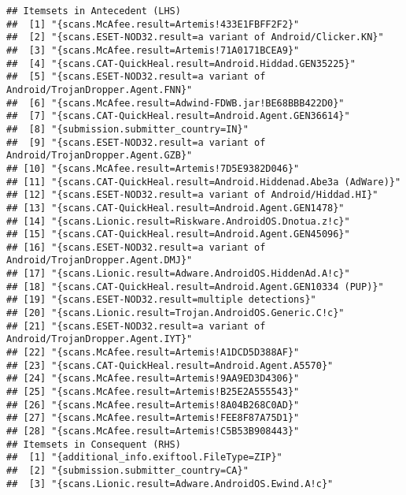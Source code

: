 \documentclass[
]{book}
\begin{document}
\begin{verbatim}
## Itemsets in Antecedent (LHS)
##  [1] "{scans.McAfee.result=Artemis!433E1FBFF2F2}"                            
##  [2] "{scans.ESET-NOD32.result=a variant of Android/Clicker.KN}"             
##  [3] "{scans.McAfee.result=Artemis!71A0171BCEA9}"                            
##  [4] "{scans.CAT-QuickHeal.result=Android.Hiddad.GEN35225}"                  
##  [5] "{scans.ESET-NOD32.result=a variant of Android/TrojanDropper.Agent.FNN}"
##  [6] "{scans.McAfee.result=Adwind-FDWB.jar!BE68BBB422D0}"                    
##  [7] "{scans.CAT-QuickHeal.result=Android.Agent.GEN36614}"                   
##  [8] "{submission.submitter_country=IN}"                                     
##  [9] "{scans.ESET-NOD32.result=a variant of Android/TrojanDropper.Agent.GZB}"
## [10] "{scans.McAfee.result=Artemis!7D5E9382D046}"                            
## [11] "{scans.CAT-QuickHeal.result=Android.Hiddenad.Abe3a (AdWare)}"          
## [12] "{scans.ESET-NOD32.result=a variant of Android/Hiddad.HI}"              
## [13] "{scans.CAT-QuickHeal.result=Android.Agent.GEN1478}"                    
## [14] "{scans.Lionic.result=Riskware.AndroidOS.Dnotua.z!c}"                   
## [15] "{scans.CAT-QuickHeal.result=Android.Agent.GEN45096}"                   
## [16] "{scans.ESET-NOD32.result=a variant of Android/TrojanDropper.Agent.DMJ}"
## [17] "{scans.Lionic.result=Adware.AndroidOS.HiddenAd.A!c}"                   
## [18] "{scans.CAT-QuickHeal.result=Android.Agent.GEN10334 (PUP)}"             
## [19] "{scans.ESET-NOD32.result=multiple detections}"                         
## [20] "{scans.Lionic.result=Trojan.AndroidOS.Generic.C!c}"                    
## [21] "{scans.ESET-NOD32.result=a variant of Android/TrojanDropper.Agent.IYT}"
## [22] "{scans.McAfee.result=Artemis!A1DCD5D388AF}"                            
## [23] "{scans.CAT-QuickHeal.result=Android.Agent.A5570}"                      
## [24] "{scans.McAfee.result=Artemis!9AA9ED3D4306}"                            
## [25] "{scans.McAfee.result=Artemis!B25E2A555543}"                            
## [26] "{scans.McAfee.result=Artemis!8A04B268C0AD}"                            
## [27] "{scans.McAfee.result=Artemis!FEE8F87A75D1}"                            
## [28] "{scans.McAfee.result=Artemis!C5B53B908443}"                            
## Itemsets in Consequent (RHS)
##  [1] "{additional_info.exiftool.FileType=ZIP}"                               
##  [2] "{submission.submitter_country=CA}"                                     
##  [3] "{scans.Lionic.result=Adware.AndroidOS.Ewind.A!c}"                      

\end{verbatim}
\end{document}
